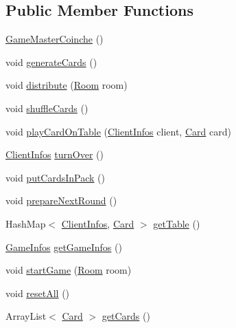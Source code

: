 \subsection*{Public Member Functions}
\begin{DoxyCompactItemize}
\item 
\mbox{\hyperlink{classServer_1_1Game_1_1GameMasterCoinche_aef694858e79e57155aed473c576a0527}{Game\+Master\+Coinche}} ()
\item 
void \mbox{\hyperlink{classServer_1_1Game_1_1GameMasterCoinche_a0f665b812c52453acdcfbdcf4e3b4658}{generate\+Cards}} ()
\item 
void \mbox{\hyperlink{classServer_1_1Game_1_1GameMasterCoinche_a99ce3630f1b23a97e1204f3c8744a208}{distribute}} (\mbox{\hyperlink{classServer_1_1ServerConnexion_1_1Room}{Room}} room)
\item 
void \mbox{\hyperlink{classServer_1_1Game_1_1GameMasterCoinche_acad3139f08fe5fc91ab79058530fcacf}{shuffle\+Cards}} ()
\item 
void \mbox{\hyperlink{classServer_1_1Game_1_1GameMasterCoinche_ad38b48bd930dd77a40f8c4fb28e8be17}{play\+Card\+On\+Table}} (\mbox{\hyperlink{classServer_1_1ServerConnexion_1_1ClientInfos}{Client\+Infos}} client, \mbox{\hyperlink{classCommon_1_1Card}{Card}} card)
\item 
\mbox{\hyperlink{classServer_1_1ServerConnexion_1_1ClientInfos}{Client\+Infos}} \mbox{\hyperlink{classServer_1_1Game_1_1GameMasterCoinche_a67214548e20a86dae287e8bf2c8a39d2}{turn\+Over}} ()
\item 
void \mbox{\hyperlink{classServer_1_1Game_1_1GameMasterCoinche_a53c0c498118ce3ac3168c5fc5f5520a6}{put\+Cards\+In\+Pack}} ()
\item 
void \mbox{\hyperlink{classServer_1_1Game_1_1GameMasterCoinche_a8c8b4fbd409a875500260ab34c8be1d5}{prepare\+Next\+Round}} ()
\item 
Hash\+Map$<$ \mbox{\hyperlink{classServer_1_1ServerConnexion_1_1ClientInfos}{Client\+Infos}}, \mbox{\hyperlink{classCommon_1_1Card}{Card}} $>$ \mbox{\hyperlink{classServer_1_1Game_1_1GameMasterCoinche_a44c8d2d0d299abe2810cb261fb389003}{get\+Table}} ()
\item 
\mbox{\hyperlink{classServer_1_1Game_1_1GameInfos}{Game\+Infos}} \mbox{\hyperlink{classServer_1_1Game_1_1GameMasterCoinche_af1232b7545c2e7253eddc6446178e2ba}{get\+Game\+Infos}} ()
\item 
void \mbox{\hyperlink{classServer_1_1Game_1_1GameMasterCoinche_a7b7262936aafc0600b8a456e7bd6a82f}{start\+Game}} (\mbox{\hyperlink{classServer_1_1ServerConnexion_1_1Room}{Room}} room)
\item 
void \mbox{\hyperlink{classServer_1_1Game_1_1GameMasterCoinche_a6dc593f52ebb75474aa72e4dfeba2a6d}{reset\+All}} ()
\item 
Array\+List$<$ \mbox{\hyperlink{classCommon_1_1Card}{Card}} $>$ \mbox{\hyperlink{classServer_1_1Game_1_1GameMasterCoinche_a82a6f6b6d3ba413af859546bfdfcb662}{get\+Cards}} ()
\end{DoxyCompactItemize}


